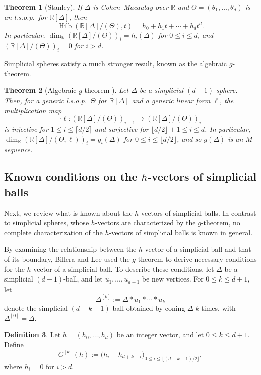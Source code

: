 \documentclass[11pt]{article}
\newtheorem{theorem}{Theorem}[section]
\theoremstyle{definition}
\newtheorem{definition}[theorem]{Definition}
\numberwithin{equation}{theorem}
\newcommand{\kk}{{\mathbb R}}
\begin{document}
\begin{theorem}[Stanley]%
\label{thm:hilb-CM}
If $\Delta$ is Cohen--Macaulay over $\kk$ and $\Theta = (\theta_1, \ldots, \theta_d)$ is an l.s.o.p.\ for $\kk[\Delta]$, then
\[
  \operatorname{Hilb}(\kk[\Delta]/(\Theta),t)=h_0+h_1t+\cdots+h_dt^d.
\]
In particular, $\dim_\kk(\kk[\Delta]/(\Theta))_i=h_i(\Delta)$ for $0\le i\le d$, and $(\kk[\Delta]/(\Theta))_i=0$ for $i>d$.
\end{theorem}

Simplicial spheres satisfy a much stronger result, known as the algebraic $g$-theorem.

\begin{theorem}[Algebraic $g$-theorem \cite{Adiprasito2018,AdiprasitoPapadakisPetrotou2021, KaruXiao2023,PapadakisPetrotou2020}]
\label{thm:algebraic-g}
Let $\Delta$ be a simplicial $(d-1)$-sphere. Then, for a generic l.s.o.p.\ $\Theta$ for $\kk[\Delta]$ and a generic linear form $\ell$, the multiplication map
\[
  \cdot\ell:(\kk[\Delta]/(\Theta))_{i-1}\longrightarrow(\kk[\Delta]/(\Theta))_i
\]
is injective for $1\le i\le\lceil d/2\rceil$ and surjective for
$\lfloor d/2\rfloor+1\le i\le d$. In particular, $\dim_\kk (\kk[\Delta]/(\Theta, \ell))_i = g_i(\Delta)$ for $0\le i\le\lfloor d/2\rfloor$, and so $g(\Delta)$ is an $M$-sequence.
\end{theorem}

\subsection{Known conditions on the $h$-vectors of simplicial balls}

Next, we review what is known about the $h$-vectors of simplicial balls. In contrast to simplicial spheres, whose $h$-vectors are characterized by the $g$-theorem, no complete characterization of the $h$-vectors of simplicial balls is known in general.

By examining the relationship between the $h$-vector of a simplicial ball and that of its boundary, Billera and Lee used the $g$-theorem to derive necessary conditions for the $h$-vector of a simplicial ball. To describe these conditions, let $\Delta$ be a simplicial $(d-1)$-ball, and let $u_1,\ldots,u_{d+1}$ be new vertices. For $0\le k\le d+1$, let
\[
  \Delta^{[k]}:=\Delta*u_1*\cdots*u_k
\]
denote the simplicial $(d+k-1)$-ball obtained by coning $\Delta$ $k$ times, with $\Delta^{[0]}=\Delta$.


\begin{definition} Let $h=(h_0,\dots,h_d)$ be an integer vector, and let $0\leq k \leq d+1$. Define 
    \[G^{[k]}(h):=
        \bigl(h_i-h_{d+k-i}\bigr)_ {0\le i\le \lfloor(d+k-1)/2\rfloor},
        \] %
    where  $h_i = 0$ for $i > d$.
    \end{definition}
    
\end{document}
